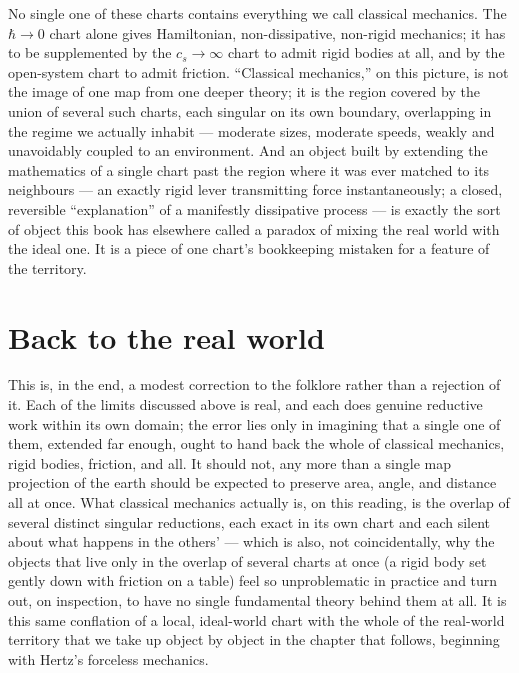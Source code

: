 No single one of these charts contains everything we call classical mechanics.
The $\hbar\to 0$ chart alone gives Hamiltonian, non-dissipative, non-rigid
mechanics; it has to be supplemented by the $c_s\to\infty$ chart to admit rigid
bodies at all, and by the open-system chart to admit friction. ``Classical
mechanics,'' on this picture, is not the image of one map from one deeper
theory; it is the region covered by the union of several such charts, each
singular on its own boundary, overlapping in the regime we actually inhabit ---
moderate sizes, moderate speeds, weakly and unavoidably coupled to an
environment. And an object built by extending the mathematics of a single chart
past the region where it was ever matched to its neighbours --- an exactly
rigid lever transmitting force instantaneously; a closed, reversible
``explanation'' of a manifestly dissipative process --- is exactly the sort of
object this book has elsewhere called a paradox of mixing the real world with
the ideal one. It is a piece of one chart's bookkeeping mistaken for a feature
of the territory.

\section{Back to the real world}

This is, in the end, a modest correction to the folklore rather than a
rejection of it. Each of the limits discussed above is real, and each does
genuine reductive work within its own domain; the error lies only in imagining
that a single one of them, extended far enough, ought to hand back the whole of
classical mechanics, rigid bodies, friction, and all. It should not, any more
than a single map projection of the earth should be expected to preserve area,
angle, and distance all at once. What classical mechanics actually is, on this
reading, is the overlap of several distinct singular reductions, each exact in
its own chart and each silent about what happens in the others' --- which is
also, not coincidentally, why the objects that live only in the overlap of
several charts at once (a rigid body set gently down with friction on a table)
feel so unproblematic in practice and turn out, on inspection, to have no
single fundamental theory behind them at all. It is this same conflation of a
local, ideal-world chart with the whole of the real-world territory that we
take up object by object in the chapter that follows, beginning with Hertz's
forceless mechanics.

